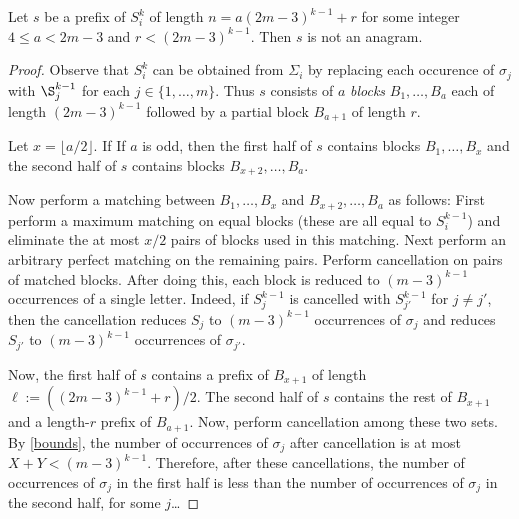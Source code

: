 \documentclass[kpfonts]{patmorin}
\begin{document}
\begin{clm}
     Let $s$ be a prefix of $S_i^k$ of length $n=a(2m-3)^{k-1} + r$ for some integer $4\le a< 2m-3$ and $r< (2m-3)^{k-1}$.  Then $s$ is not an anagram.
\end{clm}

\begin{proof}
    Observe that $S_i^k$ can be obtained from $\Sigma_i$ by replacing each occurence of $\sigma_j$ with $\S_j^{k-1}$ for each $j\in\{1,\ldots,m\}$.
    Thus $s$ consists of $a$ \emph{blocks} $B_1,\ldots,B_a$ each of length $(2m-3)^{k-1}$ followed by a partial block $B_{a+1}$ of length $r$.

    Let $x=\lfloor a/2\rfloor$.  If
    If $a$ is odd, then the first half of $s$ contains blocks $B_1,\ldots,B_{x}$ and the second half of $s$ contains blocks $B_{x+2},\ldots,B_a$.

    Now perform a matching between $B_1,\ldots,B_{x}$ and $B_{x+2},\ldots,B_a$ as follows:  First perform a maximum matching on equal blocks (these are all equal to $S_i^{k-1}$) and eliminate the at most $x/2$ pairs of blocks used in this matching.  Next perform an arbitrary perfect matching on the remaining pairs.  Perform cancellation on pairs of matched blocks.  After doing this, each block is reduced to $(m-3)^{k-1}$ occurrences of a single letter.  Indeed, if $S_{j}^{k-1}$ is cancelled with $S_{j'}^{k-1}$ for $j\neq j'$, then the cancellation reduces $S_j$ to $(m-3)^{k-1}$ occurrences of $\sigma_j$ and reduces $S_{j'}$ to $(m-3)^{k-1}$ occurrences of $\sigma_{j'}$.

    Now, the first half of $s$ contains a prefix of $B_{x+1}$ of length $\ell:=((2m-3)^{k-1} + r)/2$.  The second half of $s$ contains the rest of $B_{x+1}$ and a length-$r$ prefix of $B_{a+1}$. Now, perform cancellation among these two sets. By \cref{bounds}, the number of occurrences of $\sigma_j$ after cancellation is at most $X+Y < (m-3)^{k-1}$.  Therefore, after these cancellations, the number of occurrences of $\sigma_j$ in the first half is less than the number of occurrences of $\sigma_j$ in the second half, for some $j$\ldots{}
\end{proof}




%
%
%




%
\end{document}
